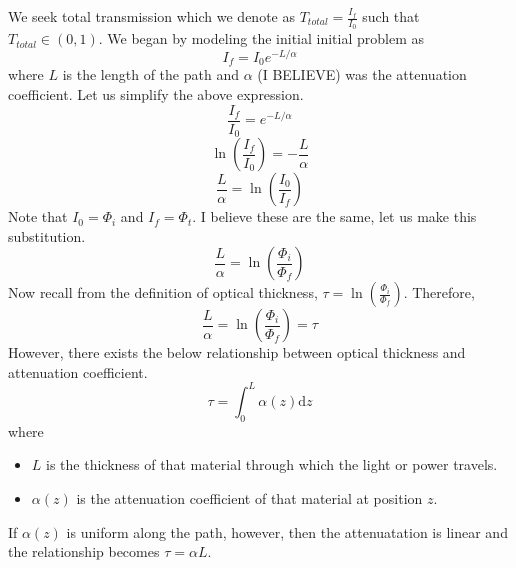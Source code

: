 \documentclass[12pt]{scrartcl}
\begin{document}
We seek total transmission which we denote as $T_{total} = \frac{I_f}{I_0}$
such that $T_{total} \in (0, 1)$. We began by modeling the initial initial
problem as
\[I_f = I_0e^{-L/\alpha}\]
where $L$ is the length of the path and $\alpha$ (I BELIEVE) was the
attenuation coefficient. Let us simplify the above expression.
\[\frac{I_f}{I_0} = e^{-L/\alpha}\]
\[\ln(\frac{I_f}{I_0}) = -\frac{L}{\alpha}\]
\[\frac{L}{\alpha} = \ln(\frac{I_0}{I_f})\]
Note that $I_0 = \Phi_i$ and $I_f = \Phi_t$. I believe these are the same, let
us make this substitution.
\[\frac{L}{\alpha} = \ln(\frac{\Phi_i}{\Phi_f})\]
Now recall from the definition of optical thickness, $\tau =
    \ln(\frac{\Phi_i}{\Phi_f})$. Therefore,
\[\frac{L}{\alpha} = \ln(\frac{\Phi_i}{\Phi_f}) = \tau\]
However, there exists the below relationship between optical thickness and
attenuation coefficient.
\[\tau = \int_0^L\alpha(z) \text{d}z\]
where
\begin{itemize}
    \item $L$ is the thickness of that material through which the light or power travels.
    \item $\alpha(z)$ is the attenuation coefficient of that material at position $z$.
\end{itemize}
If $\alpha(z)$ is uniform along the path, however, then the attenuatation is linear and the relationship becomes $\tau = \alpha L$.
\end{document}
